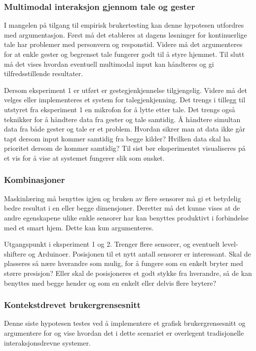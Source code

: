 \subsubsection*{Multimodal interaksjon gjennom tale og gester}
I mangelen på tilgang til empirisk brukertesting kan denne hypotesen utfordres med argumentasjon. Først må det etableres at dagens løsninger for kontinuerlige tale har problemer med personvern og responstid. Videre må det argumenteres for at enkle gester og begrenset tale fungerer godt til å styre hjemmet. Til slutt må det vises hvordan eventuell multimodal input kan håndteres og gi tilfredsstillende resultater.

Dersom eksperiment 1 er utført er gestegjenkjennelse tilgjengelig. Videre må det velges eller implementeres et system for talegjenkjenning. Det trengs i tillegg til utstyret fra eksperiment 1 en mikrofon for å lytte etter tale. Det trengs også teknikker for å håndtere data fra gester og tale samtidig. Å håndtere simultan data fra både gester og tale er et problem. Hvordan sikrer man at data ikke går tapt dersom input kommer samtidig fra begge kilder? Hvilken data skal ha prioritet dersom de kommer samtidig? Til sist bør eksperimentet visualiseres på et vis for å vise at systemet fungerer slik som ønsket.

\subsubsection*{Kombinasjoner}
Maskinlæring må benyttes igjen og bruken av flere sensorer må gi et betydelig bedre resultat i en eller begge dimensjoner. Deretter må det kunne vises at de andre egenskapene ulike enkle sensorer har kan benyttes produktivt i forbindelse med et smart hjem. Dette kan kun argumenteres.

Utgangspunkt i eksperiment 1 og 2. Trenger flere sensorer, og eventuelt level-shiftere og Arduinoer. Posisjonen til et nytt antall sensorer er interessant. Skal de plasseres så nære hverandre som mulig, for å fungere som en enkelt bryter med større presisjon? Eller skal de posisjoneres et godt stykke fra hverandre, så de kan benyttes med begge hender og som en enkelt eller delvis flere brytere?

\subsubsection*{Kontekstdrevet brukergrensesnitt}
Denne siste hypotesen testes ved å implementere et grafisk brukergrensesnitt og argumentere for og vise hvordan det i dette scenariet er overlegent tradisjonelle interaksjonsdrevne systemer.

